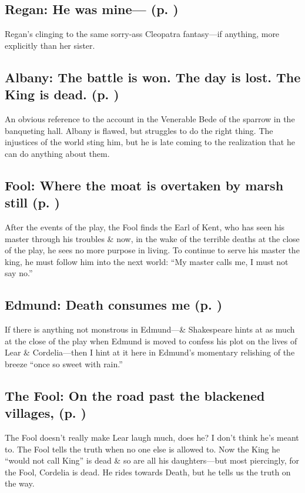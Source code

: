 \subsection{Regan: He was mine--- (p. \pageref{ch:lear_bn})}
Regan's clinging to the same sorry-ass Cleopatra fantasy---if anything, more explicitly than her sister.

\subsection{Albany: The battle is won. The day is lost. The King is dead. (p. \pageref{ch:lear_bo})}
An obvious reference to the account in the Venerable Bede of the sparrow in the banqueting hall. Albany is flawed, but struggles to do the right thing. The injustices of the world sting him, but he is late coming to the realization that he can do anything about them.

\subsection{Fool: Where the moat is overtaken by marsh still (p. \pageref{ch:lear_bp})}
After the events of the play, the Fool finds the Earl of Kent, who has seen his master through his troubles \& now, in the wake of the terrible deaths at the close of the play, he sees no more purpose in living. To continue to serve his master the king, he must follow him into the next world: ``My master calls me, I must not say no.''

\subsection{Edmund: Death consumes me (p. \pageref{ch:lear_bq})}
If there is anything not monstrous in Edmund---\& Shakespeare hints at as much at the close of the play when Edmund is moved to confess his plot on the lives of Lear \& Cordelia---then I hint at it here in Edmund's momentary relishing of the breeze ``once so sweet with rain.''

\subsection{The Fool: On the road past the blackened villages, (p. \pageref{ch:lear_br})}
The Fool doesn't really make Lear laugh much, does he? I don't think he's meant to. The Fool tells the truth when no one else is allowed to. Now the King he ``would not call King'' is dead \& so are all his daughters---but most piercingly, for the Fool, Cordelia is dead. He rides towards Death, but he tells us the truth on the way.

